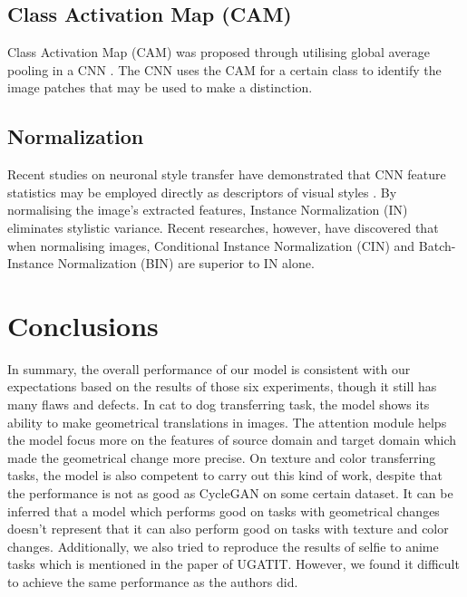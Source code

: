 \documentclass{article}
\begin{document}
\subsection{Class Activation Map (CAM)}
Class Activation Map (CAM) was proposed through utilising global average pooling in a CNN \cite{Discriminative}. The CNN uses the CAM for a certain class to identify the image patches that may be used to make a distinction.

\subsection{Normalization}
Recent studies on neuronal style transfer have demonstrated that CNN feature statistics may be employed directly as descriptors of visual styles \cite{Gram_matrix}. By normalising the image's extracted features, Instance Normalization (IN) eliminates stylistic variance. Recent researches, however, have discovered that when normalising images, Conditional Instance Normalization (CIN) \cite{CIN} and Batch-Instance Normalization (BIN) \cite{Batch-Instance} are superior to IN alone.

\section{Conclusions}
\label{sec:concl}

In summary, the overall performance of our model is consistent with our expectations based on the results of those six experiments, though it still has many flaws and defects. In cat to dog transferring task, the model shows its ability to make geometrical translations in images. The attention module helps the model focus more on the features of source domain and target domain which made the geometrical change more precise. On texture and color transferring tasks, the model is also competent to carry out this kind of work, despite that the performance is not as good as CycleGAN on some certain dataset. It can be inferred that a model which performs good on tasks with geometrical changes doesn't represent that it can also perform good on tasks with texture and color changes. Additionally, we also tried to reproduce the results of selfie to anime tasks which is mentioned in the paper of UGATIT\cite{U-GAT-IT}. However, we found it difficult to achieve the same performance as the authors did.
\end{document}
